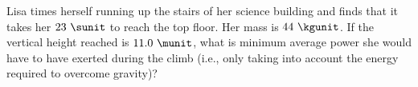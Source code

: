 Lisa times herself running up the stairs of her science building
and finds that it takes her $23\ \sunit$ to reach
the top floor. Her mass is $44\ \kgunit$. If the vertical
height reached is $11.0\ \munit$, what is minimum average power she would have to have
exerted during the climb (i.e., only taking into account the energy
required to overcome gravity)? 
